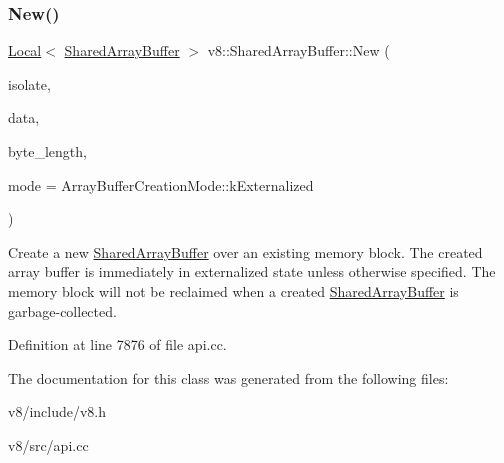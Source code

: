\subsubsection{\texorpdfstring{New()}{New()}\hspace{0.1cm}{\footnotesize\ttfamily [2/2]}}
{\footnotesize\ttfamily \mbox{\hyperlink{classv8_1_1Local}{Local}}$<$ \mbox{\hyperlink{classv8_1_1SharedArrayBuffer}{Shared\+Array\+Buffer}} $>$ v8\+::\+Shared\+Array\+Buffer\+::\+New (\begin{DoxyParamCaption}\item[{Isolate $\ast$}]{isolate,  }\item[{void $\ast$}]{data,  }\item[{\mbox{\hyperlink{classsize__t}{size\+\_\+t}}}]{byte\+\_\+length,  }\item[{Array\+Buffer\+Creation\+Mode}]{mode = {\ttfamily ArrayBufferCreationMode\+:\+:kExternalized} }\end{DoxyParamCaption})\hspace{0.3cm}{\ttfamily [static]}}

Create a new \mbox{\hyperlink{classv8_1_1SharedArrayBuffer}{Shared\+Array\+Buffer}} over an existing memory block. The created array buffer is immediately in externalized state unless otherwise specified. The memory block will not be reclaimed when a created \mbox{\hyperlink{classv8_1_1SharedArrayBuffer}{Shared\+Array\+Buffer}} is garbage-\/collected. 

Definition at line 7876 of file api.\+cc.



The documentation for this class was generated from the following files\+:\begin{DoxyCompactItemize}
\item 
v8/include/v8.\+h\item 
v8/src/api.\+cc\end{DoxyCompactItemize}
